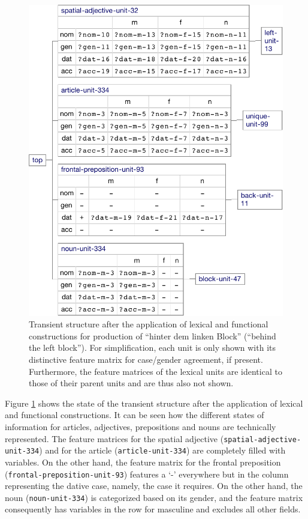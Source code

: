 \begin{figure}[t]
  \centerline{\includegraphics[scale=0.61]{figs/hinter-dem-linken-block-1}}
  \caption[Transient structure after the application of lexical and
    functional constructions]{Transient structure after the application of lexical and
    functional constructions for production of ``hinter dem linken
    Block'' (``behind the left block''). For simplification, each unit
    is only shown with its distinctive feature matrix for case/gender
    agreement, if present. Furthermore, the feature matrices of the
    lexical units are identical to those of their parent units and are
    thus also not shown.}
  \label{f:hinter-dem-linken-block-1}
\end{figure}

Figure \ref{f:hinter-dem-linken-block-1} shows the state of the
transient structure after the application of lexical and functional
constructions. It can be seen how the different states of information
for articles, adjectives, prepositions and nouns are technically
represented. The feature matrices for the spatial adjective
({\footnotesize\texttt{spatial-adjective-unit-334}}) and for the article
({\footnotesize\texttt{article-unit-334}}) are completely filled with variables. On
the other hand, the feature matrix for the frontal preposition
({\footnotesize\texttt{frontal-preposition-unit-93}}) features a `-' everywhere but
in the column representing the dative case, namely, the case it
requires. On the other hand, the noun ({\footnotesize\texttt{noun-unit-334}}) is
categorized based on its gender, and the feature matrix consequently
has variables in the row for masculine and excludes all other fields.

